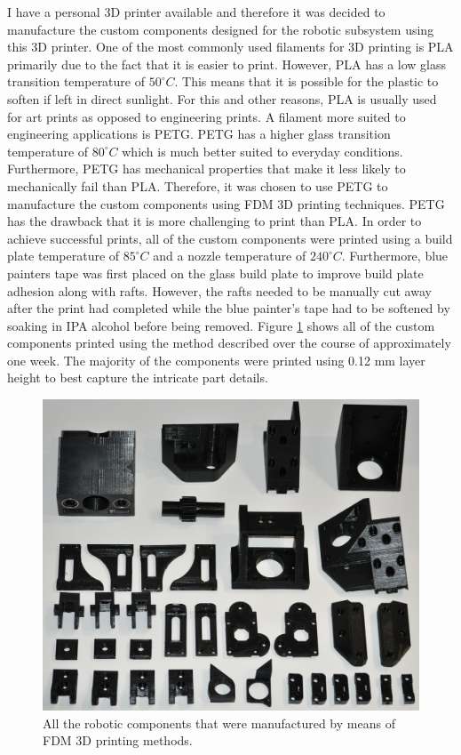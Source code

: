 I have a personal 3D printer available and therefore it was decided to manufacture the custom components designed for the robotic subsystem using this 3D printer. One of the most commonly used filaments for 3D printing is PLA primarily due to the fact that it is easier to print. However, PLA has a low glass transition temperature of $50^{\circ}C$. This means that it is possible for the plastic to soften if left in direct sunlight. For this and other reasons, PLA is usually used for art prints as opposed to engineering prints. A filament more suited to engineering applications is PETG. PETG has a higher glass transition temperature of $80^{\circ}C$ which is much better suited to everyday conditions. Furthermore, PETG has mechanical properties that make it less likely to mechanically fail than PLA. Therefore, it was chosen to use PETG to manufacture the custom components using FDM 3D printing techniques. PETG has the drawback that it is more challenging to print than PLA. In order to achieve successful prints, all of the custom components were printed using a build plate temperature of $85^{\circ}C$ and a nozzle temperature of $240^{\circ}C$. Furthermore, blue painters tape was first placed on the glass build plate to improve build plate adhesion along with rafts. However, the rafts needed to be manually cut away after the print had completed while the blue painter's tape had to be softened by soaking in IPA alcohol before being removed. Figure \ref{fig:3d-printed-components} shows all of the custom components printed using the method described over the course of approximately one week. The majority of the components were printed using 0.12 mm layer height to best capture the intricate part details.

\begin{figure}[H]
	\centering
	\includegraphics[width=0.7\linewidth]{figures/3d-printed-components.JPG}
	\caption{All the robotic components that were manufactured by means of FDM 3D printing methods.}
	\label{fig:3d-printed-components}
\end{figure}

